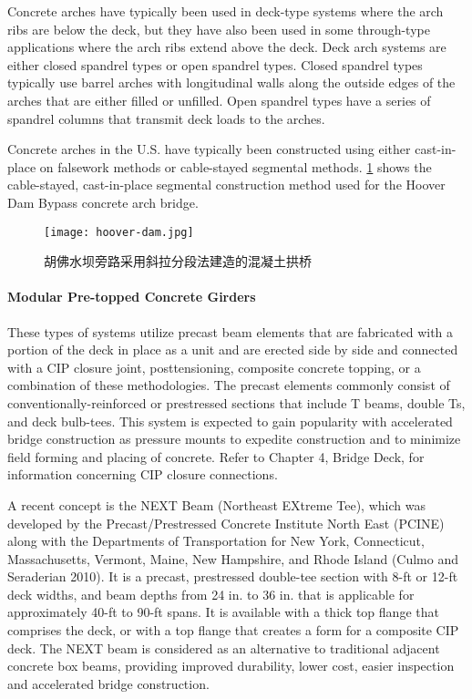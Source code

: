Concrete arches have typically been used in deck-type systems where the arch ribs are below the deck, but they
have also been used in some through-type applications where the arch ribs extend above the deck. Deck arch
systems are either closed spandrel types or open spandrel types. Closed spandrel types typically use barrel arches
with longitudinal walls along the outside edges of the arches that are either filled or unfilled. Open spandrel types
have a series of spandrel columns that transmit deck loads to the arches.


Concrete arches in the U.S. have typically been constructed using either cast-in-place on falsework methods or
cable-stayed segmental methods. \cref{fig:hoover-dam} shows the cable-stayed, cast-in-place segmental construction method
used for the Hoover Dam Bypass concrete arch bridge.

\begin{figure}
  \texttt{[image: hoover-dam.jpg]}
  \caption{胡佛水坝旁路采用斜拉分段法建造的混凝土拱桥}
  \label{fig:hoover-dam}
\end{figure}

\paragraph{Modular Pre-topped Concrete Girders}

These types of systems utilize precast beam elements that are fabricated with a portion of the deck in place as a
unit and are erected side by side and connected with a CIP closure joint, posttensioning, composite concrete topping,
or a combination of these methodologies. The precast elements commonly consist of conventionally-reinforced or prestressed sections that include T beams, double Ts, and deck bulb-tees. This system is expected to gain popularity
with accelerated bridge construction as pressure mounts to expedite construction and to minimize field forming and
placing of concrete. Refer to Chapter 4, Bridge Deck, for information concerning CIP closure connections.

A recent concept is the NEXT Beam (Northeast EXtreme Tee), which was developed by the Precast/Prestressed
Concrete Institute North East (PCINE) along with the Departments of Transportation for New York, Connecticut,
Massachusetts, Vermont, Maine, New Hampshire, and Rhode Island (Culmo and Seraderian 2010). It is a precast,
prestressed double-tee section with 8-ft or 12-ft deck widths, and beam depths from 24 in. to 36 in. that is applicable
for approximately 40-ft to 90-ft spans. It is available with a thick top flange that comprises the deck, or with a top
flange that creates a form for a composite CIP deck. The NEXT beam is considered as an alternative to traditional
adjacent concrete box beams, providing improved durability, lower cost, easier inspection and accelerated bridge
construction.

